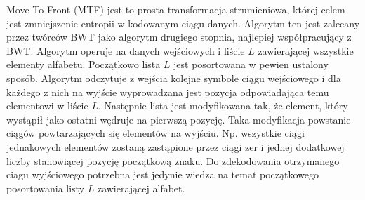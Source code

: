 
Move To Front (MTF) \cite{deorowicz} jest to prosta transformacja strumieniowa, której celem jest zmniejszenie entropii w kodowanym ciągu danych. Algorytm ten jest zalecany przez twórców BWT jako algorytm drugiego stopnia, najlepiej współpracujący z BWT. Algorytm operuje na danych wejściowych i liście $L$ zawierającej wszystkie elementy alfabetu. Początkowo lista $L$ jest posortowana w pewien ustalony sposób. Algorytm odczytuje z wejścia kolejne symbole ciągu wejściowego i dla każdego z nich na wyjście wyprowadzana jest pozycja odpowiadająca temu elementowi w liście $L$. Następnie lista jest modyfikowana tak, że element, który wystąpił jako ostatni wędruje na pierwszą pozycję. Taka modyfikacja powstanie ciągów powtarzających się elementów na wyjściu. Np. wszystkie ciągi jednakowych elementów zostaną zastąpione przez ciągi zer i jednej dodatkowej liczby stanowiącej pozycję początkową znaku. Do zdekodowania otrzymanego ciagu wyjściowego potrzebna jest jedynie wiedza na temat początkowego posortowania listy $L$ zawierającej alfabet.